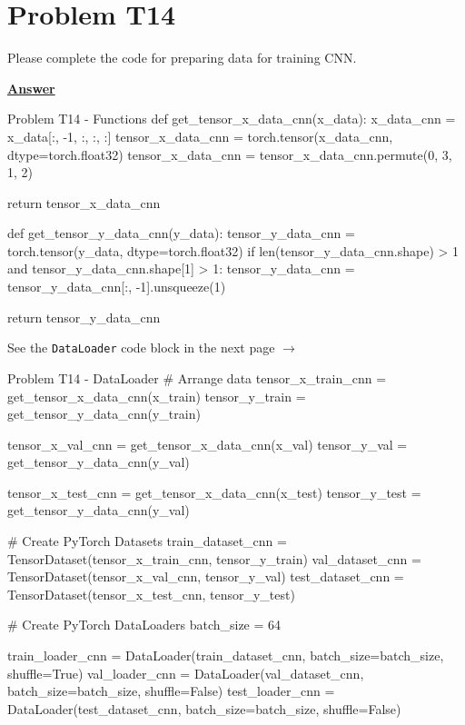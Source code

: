 \documentclass[12pt, a4paper]{article}
\begin{document}
        \section{Problem T14}
            \noindent Please complete the code for preparing data for training CNN.

            \vspace{1em}

            \noindent \underline{\textbf{Answer}}

            \vspace{0.25em}

            \begin{codeblock}{Problem T14 - Functions}
                def get_tensor_x_data_cnn(x_data):
                    x_data_cnn = x_data[:, -1, :, :, :]
                    tensor_x_data_cnn = torch.tensor(x_data_cnn, dtype=torch.float32)
                    tensor_x_data_cnn = tensor_x_data_cnn.permute(0, 3, 1, 2)

                    return tensor_x_data_cnn

                def get_tensor_y_data_cnn(y_data):
                    tensor_y_data_cnn = torch.tensor(y_data, dtype=torch.float32)
                    if len(tensor_y_data_cnn.shape) > 1 and tensor_y_data_cnn.shape[1] > 1:
                        tensor_y_data_cnn = tensor_y_data_cnn[:, -1].unsqueeze(1)
                    
                    return tensor_y_data_cnn
            \end{codeblock}
			See the \texttt{DataLoader} code block in the next page $\rightarrow$

	\pagebreak

            \begin{codeblock}{Problem T14 - DataLoader}
                # Arrange data
                tensor_x_train_cnn = get_tensor_x_data_cnn(x_train)
                tensor_y_train = get_tensor_y_data_cnn(y_train)

                tensor_x_val_cnn = get_tensor_x_data_cnn(x_val)
                tensor_y_val = get_tensor_y_data_cnn(y_val)

                tensor_x_test_cnn = get_tensor_x_data_cnn(x_test)
                tensor_y_test = get_tensor_y_data_cnn(y_val)

                # Create PyTorch Datasets
                train_dataset_cnn = TensorDataset(tensor_x_train_cnn, tensor_y_train)
                val_dataset_cnn = TensorDataset(tensor_x_val_cnn, tensor_y_val)
                test_dataset_cnn = TensorDataset(tensor_x_test_cnn, tensor_y_test)

                # Create PyTorch DataLoaders
                batch_size = 64

                train_loader_cnn = DataLoader(train_dataset_cnn, batch_size=batch_size, shuffle=True)
                val_loader_cnn = DataLoader(val_dataset_cnn, batch_size=batch_size, shuffle=False)
                test_loader_cnn = DataLoader(test_dataset_cnn, batch_size=batch_size, shuffle=False)
            \end{codeblock}
\end{document}
